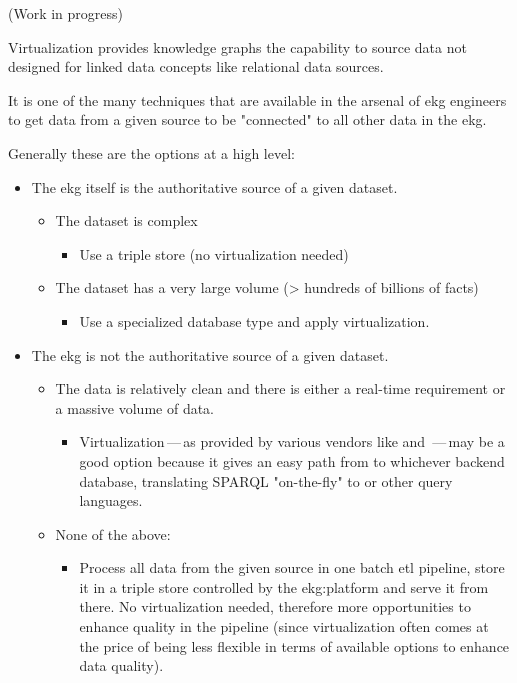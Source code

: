 %
%
(Work in progress)

Virtualization provides knowledge graphs the capability to source data not designed for linked data concepts
like relational data sources.

It is one of the many techniques that are available in the arsenal of \gls{ekg} engineers to get data from a given
source to be "connected" to all other data in the \gls{ekg}.

Generally these are the options at a high level:

\begin{itemize}
    \item The \gls{ekg} itself is the authoritative source of a given dataset.
    \begin{itemize}
        \item The dataset is complex
        \begin{itemize}
            \item Use a triple store (no virtualization needed)
        \end{itemize}
        \item The dataset has a very large volume (> hundreds of billions of facts)
        \begin{itemize}
            \item Use a specialized database type and apply virtualization.
        \end{itemize}
    \end{itemize}
    \item The \gls{ekg} is not the authoritative source of a given dataset.
    \begin{itemize}
        \item The data is relatively clean and there is either a real-time requirement or a massive volume of data.
        \begin{itemize}
            \item Virtualization\,---\,as provided by various vendors like \stardog and \graphdb\,---\,may be a
            good option because it gives an easy path from  to whichever backend database,
            translating SPARQL "on-the-fly" to  or other query languages.
        \end{itemize}
        \item None of the above:
        \begin{itemize}
            \item Process all data from the given source in one batch \gls{etl} pipeline,
            store it in a triple store controlled by the \gls{ekg:platform} and serve it from there.
            No virtualization needed, therefore more opportunities to enhance quality in the pipeline (since
            virtualization often comes at the price of being less flexible in terms of available options to enhance
            data quality).
        \end{itemize}
    \end{itemize}
\end{itemize}

